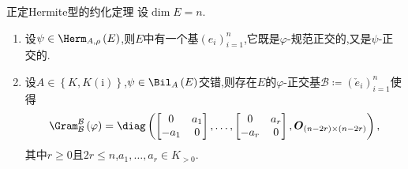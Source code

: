\begin{proposition}{正定Hermite型的约化定理}{}
	设$\dim E=n$.
	\begin{enumerate}
		\item 设$\psi\in\Herm_{A,\rho}\left(E\right)$,则$E$中有一个基$\left(e_{i}\right)_{i=1}^{n}$,它既是$\varphi$-规范正交的,又是$\psi$-正交的.
		\item 设$A\in\left\{K,K(\mathrm{i})\right\}$,$\psi\in\Bil_{A}\left(E\right)$交错,则存在$E$的$\varphi$-正交基$\mathcal{B}\coloneq\left(\check{e}_{i}\right)_{i=1}^{n}$使得
		\begin{align*}
			\Gram_{\mathcal{B}}^{\mathcal{B}}\left(\varphi\right)=\diag\left(\begin{bmatrix}
				0&a_{1}\\
				-a_{1}&0
			\end{bmatrix},\ldots,\begin{bmatrix}
			0&a_{r}\\
			-a_{r}&0
			\end{bmatrix},\boldsymbol{O}_{\left(n-2r\right)\times\left(n-2r\right)}\right),
		\end{align*}
		其中$r\geq 0$且$2r\leq n$,$a_{1},\ldots,a_{r}\in K_{>0}$.
	\end{enumerate}
\end{proposition}




















